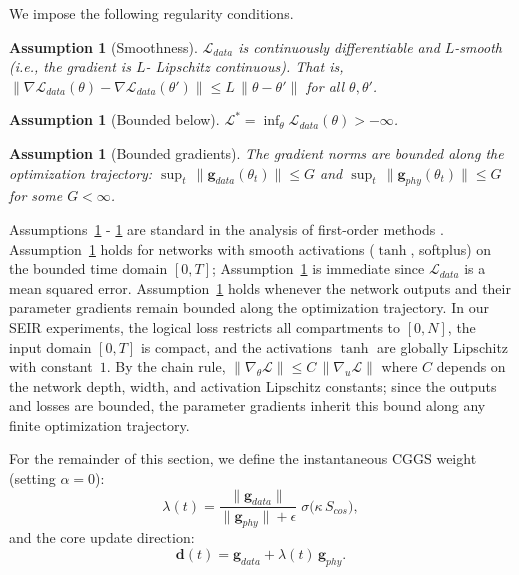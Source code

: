\documentclass[11pt]{article}
\newtheorem{assumption}[thm]{Assumption}
\begin{document}
We impose the following regularity conditions.

\begin{assumption}[Smoothness]\label{ass:smooth}
$\mathcal{L}_{data}$ is continuously differentiable and $L$-smooth (i.e., the gradient is $L$- Lipschitz continuous). That is,   $\|\nabla\mathcal{L}_{data}(\theta) - \nabla\mathcal{L}_{data}(\theta')\| \leq L\,\|\theta - \theta'\|$ for all $\theta, \theta'$.
\end{assumption}

\begin{assumption}[Bounded below]\label{ass:bounded}
$\mathcal{L}^{*} = \inf_\theta \mathcal{L}_{data}(\theta) > -\infty$.
\end{assumption}

\begin{assumption}[Bounded gradients]\label{ass:gradnorm}
The gradient norms are bounded along the optimization trajectory: $\sup_{t}\, \|\mathbf{g}_{data}(\theta_t)\| \leq G$ and $\sup_{t}\, \|\mathbf{g}_{phy}(\theta_t)\| \leq G$ for some $G < \infty$.
\end{assumption}

Assumptions~\ref{ass:smooth} - \ref{ass:bounded} are standard in the analysis of first-order methods \cite{ghadimi2013stochastic, nesterov2013introductory}. Assumption~\ref{ass:smooth} holds for networks with smooth activations ($\tanh$, softplus) on the bounded time domain $[0,T]$; Assumption~\ref{ass:bounded} is immediate since $\mathcal{L}_{data}$ is a mean squared error. Assumption~\ref{ass:gradnorm} holds whenever the network outputs and their parameter gradients remain bounded along the optimization trajectory. In our SEIR experiments, the logical loss restricts all compartments to $[0, N]$, the input domain $[0, T]$ is compact, and the activations $\tanh$ are globally Lipschitz with constant~$1$. By the chain rule, $\|\nabla_{\theta}\mathcal{L}\| \le C\,\|\nabla_{u}\mathcal{L}\|$ 
where $C$ depends on the network depth, width, and activation Lipschitz 
constants; since the outputs and losses are bounded, the parameter 
gradients inherit this bound along any finite optimization trajectory.

For the remainder of this section, we define the instantaneous CGGS weight (setting $\alpha = 0$):
\begin{equation}\label{eq:lambda_inst}
\lambda(t) = \frac{\|\mathbf{g}_{data}\|}{\|\mathbf{g}_{phy}\| + \epsilon}\; \sigma\bigl(\kappa\, S_{cos}\bigr),
\end{equation}
and the core update direction:
\begin{equation}\label{eq:core_update}
\mathbf{d}(t) = \mathbf{g}_{data} + \lambda(t)\, \mathbf{g}_{phy}.
\end{equation}
\end{document}
